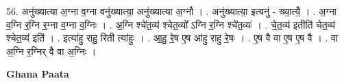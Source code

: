 \documentclass[17pt]{extarticle}
\begin{document}
56. अनु॑ख्यात्या अ॒ग्ना व॒ग्ना वनु॑ख्यात्या॒ अनु॑ख्यात्या अ॒ग्नौ । . अनु॑ख्यात्या॒ इत्यनु॑ - ख्या॒त्यै॒ । . अ॒ग्ना व॒ग्नि र॒ग्नि र॒ग्ना व॒ग्ना व॒ग्निः । . अ॒ग्नि श्चे॑त॒व्य॑ श्चेत॒व्यो᳚ ऽग्नि र॒ग्नि श्चे॑त॒व्यः॑ । . चे॒त॒व्य॑ इतीति॑ चेत॒व्य॑ श्चेत॒व्य॑ इति॑ । . इत्या॑हु राहु॒ रिती त्या॑हुः । . आ॒हु॒ रे॒ष ए॒ष आ॑हु राहु रे॒षः । . ए॒ष वै वा ए॒ष ए॒ष वै । . वा अ॒ग्नि र॒ग्निर् वै वा अ॒ग्निः । \newline

\textbf{Ghana Paata } \newline
\end{document}
